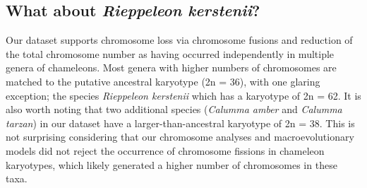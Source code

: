 \documentclass[a4paper, 12pt]{article}
\begin{document}
\subsection{What about \textit{Rieppeleon kerstenii}?}
Our dataset supports chromosome loss via chromosome fusions and reduction of the total chromosome number as having occurred independently in multiple genera of chameleons. 
Most genera with higher numbers of chromosomes are matched to the putative ancestral karyotype (2n = 36), with one glaring exception; the species \textit{Rieppeleon kerstenii} which has a karyotype of 2n = 62. 
It is also worth noting that two additional species (\textit{Calumma amber} and \textit{Calumma tarzan}) in our dataset have a larger-than-ancestral karyotype of 2n = 38. 
This is not surprising considering that our chromosome analyses and macroevolutionary models did not reject the occurrence of chromosome fissions in chameleon karyotypes, which likely generated a higher number of chromosomes in these taxa.
\end{document}
